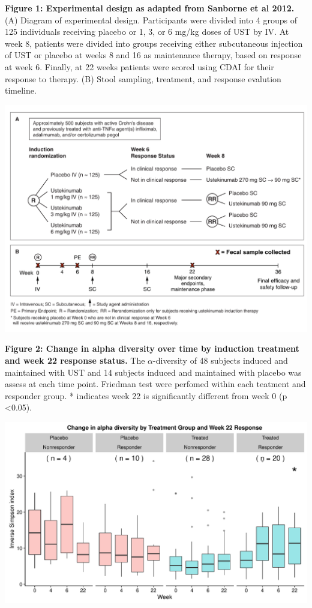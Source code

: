 \documentclass[11pt,]{article}
\begin{document}
\textbf{Figure 1: Experimental design as adapted from Sanborne et al
2012.} (A) Diagram of experimental design. Participants were divided
into 4 groups of 125 individuals receiving placebo or 1, 3, or 6 mg/kg
doses of UST by IV. At week 8, patients were divided into groups
receiving either subcutaneous injection of UST or placebo at weeks 8 and
16 as maintenance therapy, based on response at week 6. Finally, at 22
weeks patients were scored using CDAI for their response to therapy. (B)
Stool sampling, treatment, and response evalution timeline.

\includegraphics{figures/Figure1_expdesign.pdf}

\newpage

\textbf{Figure 2: Change in alpha diversity over time by induction
treatment and week 22 response status.} The \({\alpha}\)-diversity of 48
subjects induced and maintained with UST and 14 subjects induced and
maintained with placebo was assess at each time point. Friedman test
were perfomed within each teatment and responder group. * indicates week
22 is significantly different from week 0 (p \textless{}0.05).

\includegraphics{figures/Figure2_alltp.adivXvisitXindtrtXrelRSPwk22.pdf}
\end{document}
